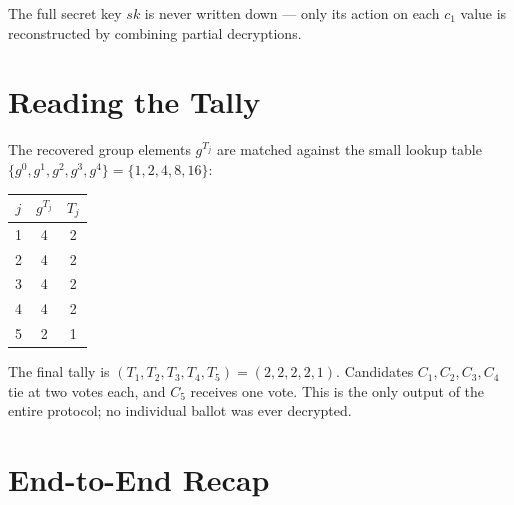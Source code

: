 \documentclass[12pt,a4paper,oneside]{report}
\begin{document}
The full secret key $sk$ is never written down --- only its action on 
each $c_1$ value is reconstructed by combining partial decryptions.

\section{Reading the Tally}
\label{sec:byhand-tally}

The recovered group elements $g^{T_j}$ are matched against the small 
lookup table $\{g^0, g^1, g^2, g^3, g^4\} = \{1, 2, 4, 8, 16\}$:

\begin{table}[H]
\centering
\small
\begin{tabular}{ccc}
\toprule
$j$ & $g^{T_j}$ & $T_j$ \\
\midrule
1 & 4 & 2 \\
2 & 4 & 2 \\
3 & 4 & 2 \\
4 & 4 & 2 \\
5 & 2 & 1 \\
\bottomrule
\end{tabular}
\end{table}

The final tally is $(T_1, T_2, T_3, T_4, T_5) = (2, 2, 2, 2, 1)$. 
Candidates $C_1, C_2, C_3, C_4$ tie at two votes each, and $C_5$ receives 
one vote. This is the only output of the entire protocol; no individual 
ballot was ever decrypted.

\section{End-to-End Recap}
\label{sec:byhand-recap}
\end{document}
